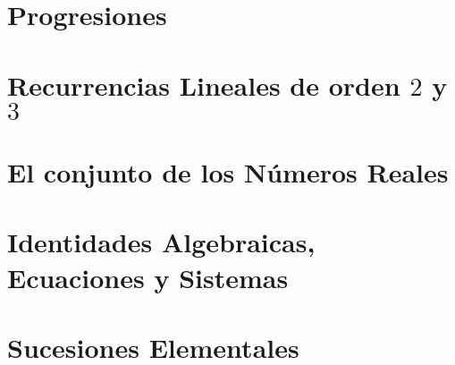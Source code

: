 \section{Progresiones}

\section{Recurrencias Lineales de orden $2$ y $3$}

\section{El conjunto de los N\'{u}meros Reales}

\section{Identidades Algebraicas, Ecuaciones y Sistemas}

\section{Sucesiones Elementales}
